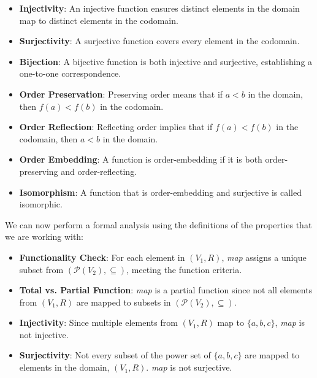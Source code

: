 \documentclass[12pt]{article}
\begin{document}
\begin{spacing}{1.5}
\begin{itemize}
		\item \textbf{Injectivity}: An injective function ensures distinct elements in the domain map to distinct elements in the codomain.
		          
		\item \textbf{Surjectivity}: A surjective function covers every element in the codomain.
		          
		\item \textbf{Bijection}: A bijective function is both injective and surjective, establishing a one-to-one correspondence.
		          
		\item \textbf{Order Preservation}: Preserving order means that if $a < b$ in the domain, then $f(a) < f(b)$ in the codomain.
		          
		\item \textbf{Order Reflection}: Reflecting order implies that if $f(a) < f(b)$ in the codomain, then $a < b$ in the domain.
		          
		\item \textbf{Order Embedding}: A function is order-embedding if it is both order-preserving and order-reflecting.
		          
		\item \textbf{Isomorphism}: A function that is order-embedding and surjective is called isomorphic. 
	\end{itemize}
	
	\noindent We can now perform a formal analysis using the definitions of the properties that we are working with:
	
	\begin{itemize}
		\item \textbf{Functionality Check}: For each element in $(V_1, R)$, \textit{map} assigns a unique subset from $(\mathcal{P}(V_2), \subseteq)$, meeting the function criteria.
		      
		\item \textbf{Total vs. Partial Function}: \textit{map} is a partial function since not all elements from $(V_1, R)$ are mapped to subsets in $(\mathcal{P}(V_2), \subseteq)$.
		      
		\item \textbf{Injectivity}: Since multiple elements from $(V_1, R)$ map to $\{a,b,c\}$, \textit{map} is not injective.
		      
		\item \textbf{Surjectivity}: Not every subset of the power set of $\{a,b,c\}$ are mapped to elements in the domain, $(V_1,R)$. \textit{map} is not surjective.
		      

\end{itemize}
\end{spacing}
\end{document}
